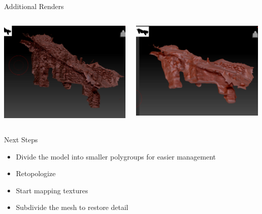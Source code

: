 \begin{frame}{Additional Renders}
    \begin{columns}[T] %
        \begin{column}{0.5\textwidth}
            \includegraphics[width=\textwidth, keepaspectratio]{images/maya/image3.png}
        \end{column}
        \begin{column}{0.5\textwidth}
            \includegraphics[width=\textwidth, keepaspectratio]{images/maya/image4.png}
        \end{column}
    \end{columns}
\end{frame}

\begin{frame}{Next Steps}
    \begin{itemize}
        \item Divide the model into smaller polygroups for easier management
        \item Retopologize
        \item Start mapping textures
        \item Subdivide the mesh to restore detail
    \end{itemize}    
\end{frame}
